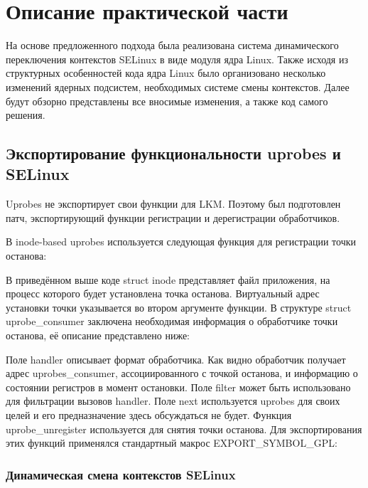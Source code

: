 \newpage
\section{Описание практической части}

На основе предложенного подхода была реализована система динамического
переключения контекстов SELinux в виде модуля ядра Linux. Также исходя
из структурных особенностей кода ядра Linux было организовано несколько
изменений ядерных подсистем, необходимых системе смены контекстов. Далее
будут обзорно представлены все вносимые изменения, а также код самого
решения.

\subsection{Экспортирование функциональности uprobes и SELinux}

Uprobes не экспортирует свои функции для LKM. Поэтому был подготовлен
патч, экспортирующий функции регистрации и дерегистрации обработчиков.

В inode-based uprobes используется следующая функция для регистрации
точки останова:


\bigskip
В приведённом выше коде struct inode представляет файл приложения, на
процесс которого будет установлена точка останова. Виртуальный адрес
установки точки указывается во втором аргументе функции. В структуре
struct uprobe\_consumer заключена необходимая информация о обработчике
точки останова, её описание представлено ниже:


\bigskip

Поле handler описывает формат обработчика. Как видно обработчик получает
адрес uprobes\_consumer, ассоциированного с точкой останова, и
информацию о состоянии регистров в момент остановки. Поле filter может
быть использовано для фильтрации вызовов handler. Поле next используется
uprobes для своих целей и его предназначение здесь обсуждаться не будет.
Функция uprobe\_unregister используется для снятия точки останова. Для
экспортирования этих функций применялся стандартный макрос
EXPORT\_SYMBOL\_GPL:


\subsubsection{Динамическая смена контекстов SELinux}

